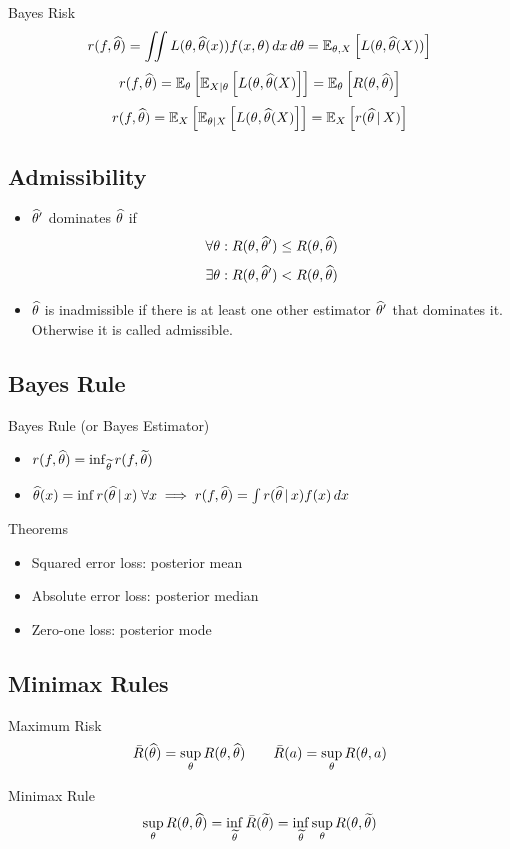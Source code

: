 \documentclass[landscape]{article}
\begin{document}
\begin{multicols*}{2}
Bayes Risk
$$r(f,\that) 
= \iint L(\theta,\that(x))f(x,\theta)\dx\dtheta
= \E[\theta,X]{L(\theta,\that(X))}$$
$$r(f,\that) 
= \E[\theta]{\E[X|\theta]{L(\theta,\that(X)}}
= \E[\theta]{R(\theta,\that)}$$
$$r(f,\that) 
= \E[X]{\E[\theta|X]{L(\theta,\that(X)}}
= \E[X]{r(\that\giv X)}$$

\subsection{Admissibility}

\begin{itemize}
  \item $\that^\prime$ dominates $\that$ if
    $$\forall \theta: R(\theta,\that^\prime) \le R(\theta,\that)$$
    $$\exists \theta: R(\theta,\that^\prime) < R(\theta,\that)$$
  \item $\that$ is inadmissible if there is at least one other estimator
    $\that^\prime$ that dominates it. Otherwise it is called admissible.
\end{itemize}

\subsection{Bayes Rule}
Bayes Rule (or Bayes Estimator)
\begin{itemize}
  \item $r(f,\that) = \inf_{\ttil} r(f,\ttil)$
  \item $\that(x) = \inf r(\that\giv x) \; \forall x 
\imp r(f,\that) = \int r(\that\giv x)f(x)\,dx$
\end{itemize}

Theorems
\begin{itemize}
  \item Squared error loss: posterior mean
  \item Absolute error loss: posterior median
  \item Zero-one loss: posterior mode
\end{itemize}

\subsection{Minimax Rules}
Maximum Risk
$$\bar{R}(\that) = \sup_\theta R(\theta,\that) \qquad
\bar{R}(a) = \sup_\theta R(\theta,a)$$

Minimax Rule
$$\sup_\theta R(\theta,\that) 
= \inf_{\ttil} \bar{R}(\ttil)
= \inf_{\ttil} \sup_\theta R(\theta,\ttil)$$


\end{multicols*}
\end{document}
